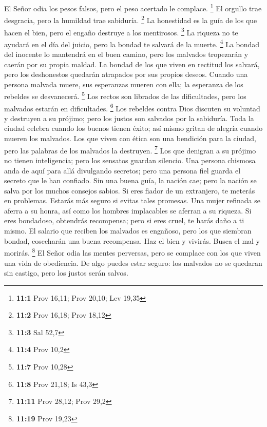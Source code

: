  El Señor odia los pesos falsos, pero el peso acertado le
complace. \footnote{\textbf{11:1} Prov 16,11; Prov 20,10; Lev 19,35}
 El orgullo trae desgracia, pero la humildad trae sabiduría.
\footnote{\textbf{11:2} Prov 16,18; Prov 18,12}  La
honestidad es la guía de los que hacen el bien, pero el engaño destruye
a los mentirosos. \footnote{\textbf{11:3} Sal 52,7}  La
riqueza no te ayudará en el día del juicio, pero la bondad te salvará de
la muerte. \footnote{\textbf{11:4} Prov 10,2}  La bondad del
inocente lo mantendrá en el buen camino, pero los malvados tropezarán y
caerán por su propia maldad.  La bondad de los que viven en
rectitud los salvará, pero los deshonestos quedarán atrapados por sus
propios deseos.  Cuando una persona malvada muere, sus
esperanzas mueren con ella; la esperanza de los rebeldes se desvanecerá.
\footnote{\textbf{11:7} Prov 10,28}  Los rectos son librados
de las dificultades, pero los malvados estarán en dificultades.
\footnote{\textbf{11:8} Prov 21,18; Is 43,3}  Los rebeldes
contra Dios discuten su voluntad y destruyen a su prójimo; pero los
justos son salvados por la sabiduría.  Toda la ciudad
celebra cuando los buenos tienen éxito; así mismo gritan de alegría
cuando mueren los malvados.  Los que viven con ética son
una bendición para la ciudad, pero las palabras de los malvados la
destruyen. \footnote{\textbf{11:11} Prov 28,12; Prov 29,2} 
Los que denigran a su prójimo no tienen inteligencia; pero los sensatos
guardan silencio.  Una persona chismosa anda de aquí para
allá divulgando secretos; pero una persona fiel guarda el secreto que le
han confiado.  Sin una buena guía, la nación cae; pero la
nación se salva por los muchos consejos sabios.  Si eres
fiador de un extranjero, te meterás en problemas. Estarás más seguro si
evitas tales promesas.  Una mujer refinada se aferra a su
honra, así como los hombres implacables se aferran a su riqueza.
 Si eres bondadoso, obtendrás recompensa; pero si eres
cruel, te harás daño a ti mismo.  El salario que reciben
los malvados es engañoso, pero los que siembran bondad, cosecharán una
buena recompensa.  Haz el bien y vivirás. Busca el mal y
morirás. \footnote{\textbf{11:19} Prov 19,23}  El Señor
odia las mentes perversas, pero se complace con los que viven una vida
de obediencia.  De algo puedes estar seguro: los malvados
no se quedaran sin castigo, pero los justos serán salvos. 
